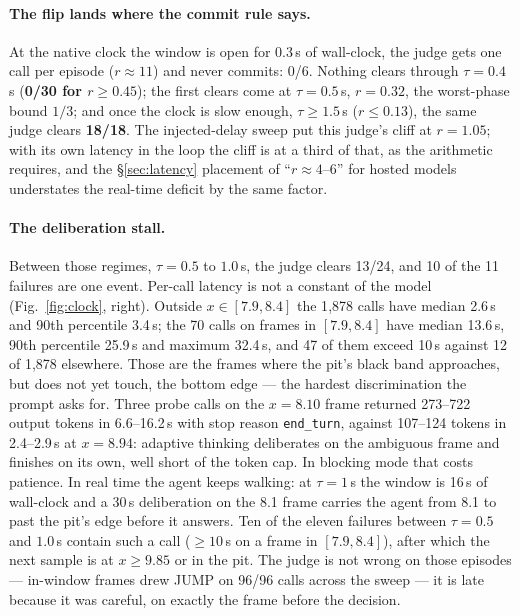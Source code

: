 \documentclass[11pt]{article}
\newcommand{\code}[1]{\texttt{#1}}
\begin{document}
\paragraph{The flip lands where the commit rule says.} At the native clock
the window is open for 0.3\,s of wall-clock, the judge gets one call per
episode ($r \approx 11$) and never commits: 0/6. Nothing clears through
$\tau = 0.4$\,s (\textbf{0/30 for $r \ge 0.45$}); the first clears come at
$\tau = 0.5$\,s, $r = 0.32$, the worst-phase bound $1/3$; and once the clock
is slow enough, $\tau \ge 1.5$\,s ($r \le 0.13$), the same judge clears
\textbf{18/18}. The injected-delay sweep put this judge's cliff at
$r = 1.05$; with its own latency in the loop the cliff is at a third of
that, as the arithmetic requires, and the \S\ref{sec:latency} placement of
``$r \approx 4$--$6$'' for hosted models understates the real-time deficit
by the same factor.

\paragraph{The deliberation stall.} Between those regimes, $\tau = 0.5$ to
$1.0$\,s, the judge clears 13/24, and 10 of the 11 failures are one event.
Per-call latency is not a constant of the model (Fig.~\ref{fig:clock},
right). Outside $x \in [7.9, 8.4]$ the 1{,}878 calls have median 2.6\,s and
90th percentile 3.4\,s; the 70 calls on frames in $[7.9, 8.4]$ have median
13.6\,s, 90th percentile 25.9\,s and maximum 32.4\,s, and 47 of them exceed
10\,s against 12 of 1{,}878 elsewhere. Those are the frames where the pit's
black band approaches, but does not yet touch, the bottom edge --- the
hardest discrimination the prompt asks for. Three probe calls on the
$x = 8.10$ frame returned 273--722 output tokens in 6.6--16.2\,s with stop
reason \code{end\_turn}, against 107--124 tokens in 2.4--2.9\,s at
$x = 8.94$: adaptive thinking deliberates on the ambiguous frame and
finishes on its own, well short of the token cap. In blocking mode that
costs patience. In real time the agent keeps walking: at $\tau = 1$\,s the
window is 16\,s of wall-clock and a 30\,s deliberation on the 8.1 frame
carries the agent from 8.1 to past the pit's edge before it answers. Ten of
the eleven failures between $\tau = 0.5$ and $1.0$\,s contain such a call
($\ge 10$\,s on a frame in $[7.9, 8.4]$), after which the next sample is at
$x \ge 9.85$ or in the pit. The judge is not wrong on those episodes ---
in-window frames drew JUMP on 96/96 calls across the sweep --- it is late
because it was careful, on exactly the frame before the decision.
\end{document}
